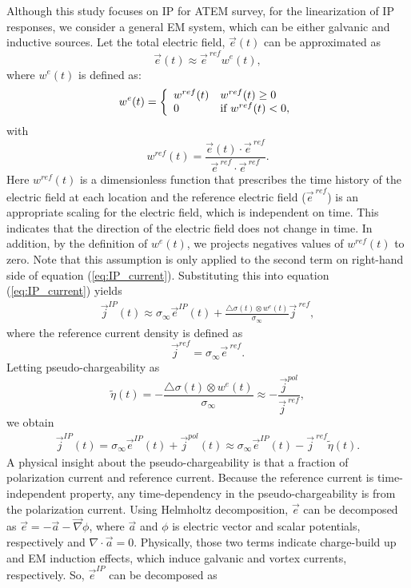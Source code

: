 \documentclass[a4paper, 11pt]{article}
\renewcommand{\div}{\nabla\cdot}
\newcommand{\grad}{\vec \nabla}
\newcommand{\siginf}{\sigma_\infty}
\newcommand{\dsig}{\triangle\sigma}
\renewcommand {\j}  { {\vec j} }
\newcommand {\e}  { {\vec e} }
\newcommand{\peta}{\tilde{\eta}}
\newcommand{\eref}{\e^{\ ref}}
\begin{document}
Although this study focuses on IP for ATEM survey, for the linearization of IP responses, we consider a general EM system, which can be either galvanic and inductive sources. 
Let the total electric field, $\e(t)$ can be approximated as
\begin{equation}
  \e(t) \approx \eref w^e(t),
  \label{eq: e_with_eref}
\end{equation}
where $w^e(t)$ is defined as:
\begin{equation}
  w^e(t) = \left\{ 
  \begin{array}{l l}
    w^{ref}(t) & w^{ref}(t) \ge 0 \\
    0 & \text{if } w^{ref}(t) < 0, 
  \end{array}\right.
  \label{eq: we}
\end{equation}
with
\begin{equation}
  w^{ref}(t) = \frac{\e(t)\cdot\eref}{\eref\cdot\eref}.
\end{equation}
Here $w^{ref}(t)$ is a dimensionless function that prescribes the time history of the electric field at each location and the reference electric field ($\eref$) is an appropriate scaling for the electric field, which is independent on time. 
This indicates that the direction of the electric field does not change in time. 
In addition, by the definition of $w^e(t)$, we projects negatives values of  $w^{ref}(t)$ to zero.
Note that this assumption is only applied to the second term on right-hand side of equation (\ref{eq:IP_current}). 
Substituting this into equation (\ref{eq:IP_current}) yields
\begin{eqnarray*}
  \j^{IP}(t) \approx \siginf\e^{IP}(t) + \frac{\dsig(t)\otimes w^e(t)}{\siginf}\j^{\ ref},
\end{eqnarray*}
where the reference current density is defined as
\begin{equation}
  \j^{ref} = \siginf\eref.
\end{equation}
Letting pseudo-chargeability as
\begin{equation}
    \peta(t) = -\frac{\dsig(t)\otimes w^e(t)}{\siginf} \approx -\frac{\j^{pol}}{\j^{\ ref}},
    \label{eq: pseudochargeability}
\end{equation}
we obtain
\begin{eqnarray}
  \j^{IP}(t) = \siginf\e^{IP}(t) + \j^{pol}(t) \approx \siginf\e^{IP}(t) -\j^{\ ref}\peta(t).
  \label{eq: jip_EMIP}
\end{eqnarray}
A physical insight about the pseudo-chargeability is that a fraction of polarization current and reference current. Because the reference current is time-independent property, any time-dependency in the pseudo-chargeability is from the polarization current. Using Helmholtz decomposition, $\e$ can be decomposed as $\e=-\vec{a}-\grad\phi$, where $\vec{a}$ and $\phi$ is electric vector and scalar potentials, respectively and $\div\vec{a}=0$. Physically, those two terms indicate charge-build up and EM induction effects, which induce galvanic and vortex currents, respectively. So, $\e^{IP}$ can be decomposed as
\end{document}
